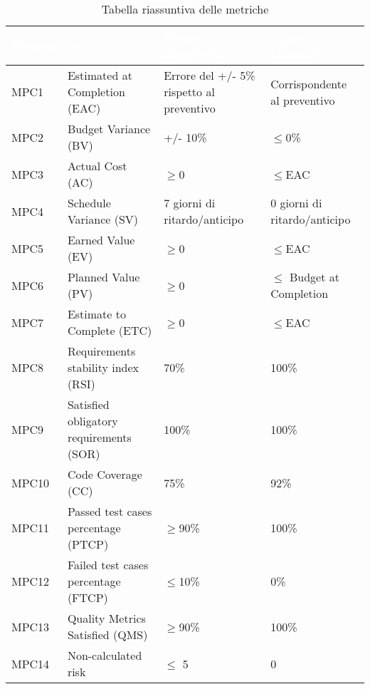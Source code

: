 \begin{table}[H]
  \renewcommand{\arraystretch}{1.25}
  \begin{tabular}{|p{1.7cm}|p{3.5cm}|p{4cm}|p{3.3cm}|} \hline
    \rowcolor[HTML]{036400}
    \textcolor{white}{\textbf{Metrica}} & \textcolor{white}{\textbf{Nome}} & \textcolor{white}{\textbf{Valore Accettabile}} & \textcolor{white}{\textbf{Valore Ottimale}}    \\ \hline
      \rowcolor[HTML]{EFEFEF}
      MPC1 & Estimated at Completion (EAC)&  Errore del +/- 5\% rispetto al preventivo & Corrispondente al preventivo   \\ \hline
      \rowcolor[HTML]{C0C0C0}
      MPC2 & Budget Variance (BV) & +/- 10\%  & $\leq$0\%    \\ \hline
      \rowcolor[HTML]{EFEFEF}
      MPC3 & Actual Cost (AC)   & $\geq$0  & $\leq$EAC    \\ \hline
      \rowcolor[HTML]{C0C0C0}
      MPC4 & Schedule Variance (SV) & 7 giorni di ritardo/anticipo & 0 giorni di ritardo/anticipo     \\ \hline
      \rowcolor[HTML]{EFEFEF}
      MPC5 & Earned Value (EV) & $\geq$0  & $\leq$EAC   \\ \hline
      \rowcolor[HTML]{C0C0C0}
      MPC6 & Planned Value (PV) & $\geq$0 & $\leq$ Budget at Completion   \\ \hline
      \rowcolor[HTML]{EFEFEF}
      MPC7 & Estimate to Complete (ETC) & $\geq$0  & $\leq$EAC   \\ \hline
      \rowcolor[HTML]{C0C0C0}
      MPC8 & Requirements stability index (RSI) & 70\% & 100\%   \\ \hline
      \rowcolor[HTML]{EFEFEF}
      MPC9 & Satisfied obligatory requirements (SOR) & 100\%  & 100\%   \\ \hline
      \rowcolor[HTML]{C0C0C0}
      MPC10 & Code Coverage (CC)& 75\% & 92\%   \\ \hline
      \rowcolor[HTML]{EFEFEF}
      MPC11 & Passed test cases percentage (PTCP) & $\geq$90\%  &  100\%  \\ \hline
      \rowcolor[HTML]{C0C0C0}
      MPC12 & Failed test cases percentage (FTCP) & $\leq$10\% &  0\% \\ \hline
      \rowcolor[HTML]{EFEFEF}
      MPC13 & Quality Metrics Satisfied (QMS) & $\geq$90\%  & 100\%   \\ \hline
      \rowcolor[HTML]{C0C0C0}
      MPC14 & Non-calculated risk & $\leq$ 5& 0   \\ \hline
  \end{tabular}
  \caption{Tabella riassuntiva delle metriche}
\end{table}
